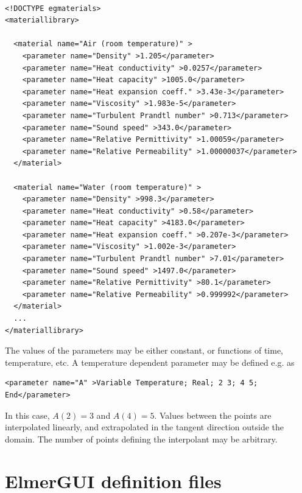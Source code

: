 \begin{footnotesize}
\begin{verbatim}
 
<!DOCTYPE egmaterials>
<materiallibrary>
  
  <material name="Air (room temperature)" >
    <parameter name="Density" >1.205</parameter>
    <parameter name="Heat conductivity" >0.0257</parameter>
    <parameter name="Heat capacity" >1005.0</parameter>
    <parameter name="Heat expansion coeff." >3.43e-3</parameter>
    <parameter name="Viscosity" >1.983e-5</parameter>
    <parameter name="Turbulent Prandtl number" >0.713</parameter>
    <parameter name="Sound speed" >343.0</parameter>
    <parameter name="Relative Permittivity" >1.00059</parameter>
    <parameter name="Relative Permeability" >1.00000037</parameter>
  </material>

  <material name="Water (room temperature)" >
    <parameter name="Density" >998.3</parameter>
    <parameter name="Heat conductivity" >0.58</parameter>
    <parameter name="Heat capacity" >4183.0</parameter>
    <parameter name="Heat expansion coeff." >0.207e-3</parameter>
    <parameter name="Viscosity" >1.002e-3</parameter>
    <parameter name="Turbulent Prandtl number" >7.01</parameter>
    <parameter name="Sound speed" >1497.0</parameter>
    <parameter name="Relative Permittivity" >80.1</parameter>
    <parameter name="Relative Permeability" >0.999992</parameter>
  </material>
  ...
</materiallibrary>

\end{verbatim}
\end{footnotesize}

The values of the parameters may be either constant, or functions of time, temperature, etc.
A temperature dependent parameter may be defined e.g. as

\begin{footnotesize}
\begin{verbatim}
<parameter name="A" >Variable Temperature; Real; 2 3; 4 5; End</parameter>
\end{verbatim}
\end{footnotesize}
In this case, $A(2)=3$ and $A(4)=5$. Values between the points are interpolated linearly,
and extrapolated in the tangent direction outside the domain. The number of points defining 
the interpolant may be arbitrary. 

\chapter{ElmerGUI definition files}

